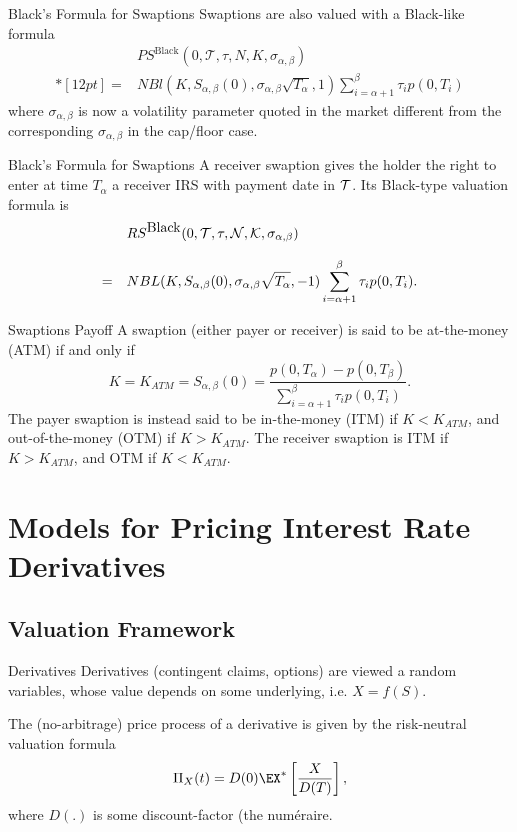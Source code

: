 

Black's Formula for Swaptions
	Swaptions are also valued with a Black-like formula
		$$
		\begin{array}{ll}
		&\displaystyle
		PS^{\mbox{Black}}(0,{\mathcal T},\tau,N,K,\sigma_{\alpha,\beta})\\*[12pt]
		=& \displaystyle NBl(K,S_{\alpha,\beta}(0),\sigma_{\alpha,\beta}\sqrt{T_{\alpha}},1)\sum_{i=\alpha+1}^{\beta}\tau_ip(0,T_i)
		\end{array}
		$$
	where $\sigma_{\alpha,\beta}$ is now a volatility parameter quoted
	in the market different from the corresponding
	$\sigma_{\alpha,\beta}$ in the cap/floor case.


Black's Formula for Swaptions
	A receiver swaption
	gives the holder the right to enter at time $T_{\alpha}$ a
	receiver IRS with payment date in $\cal T$. Its Black-type
	valuation formula is
		$$
		\begin{array}{ll}
		&\displaystyle
		RS^{\mbox{Black}}(0,\cal T,\tau,N,K,\sigma_{\alpha,\beta})\\*[12pt]
		=&\displaystyle
		NBL(K,S_{\alpha,\beta}(0),\sigma_{\alpha,\beta}\sqrt{T_{\alpha}},-1)\sum_{i=\alpha+1}^{\beta}\tau_ip(0,T_i).
		\end{array}
		$$


Swaptions Payoff
A swaption (either payer or receiver) is said to be at-the-money
(ATM) if and only if
	$$
	K=K_{ATM}=S_{\alpha,\beta}(0)=\frac{p(0,T_{\alpha})-p(0,T_{\beta})}{\sum_{i=\alpha+1}^{\beta}\tau_ip(0,T_i)}.
	$$
The payer swaption is instead said to be in-the-money (ITM) if
$K<K_{ATM}$, and out-of-the-money (OTM) if $K>K_{ATM}$. The
receiver swaption is ITM if $K>K_{ATM}$, and OTM if $K<K_{ATM}$.


\section{Models for Pricing Interest Rate Derivatives}
\subsection{Valuation Framework}

Derivatives
	Derivatives (contingent claims, options) are viewed a random variables, whose value depends on some
	underlying, i.e. $X=f(S)$.
	
	The (no-arbitrage) price process of a derivative is given by the risk-neutral valuation
	formula
		$$
		\Pi_X(t) = D(0)
		\EX^*\left[\frac{X}{D(T)}\right],
		$$
	where $D(.)$ is some discount-factor (the num{\'e}raire.


